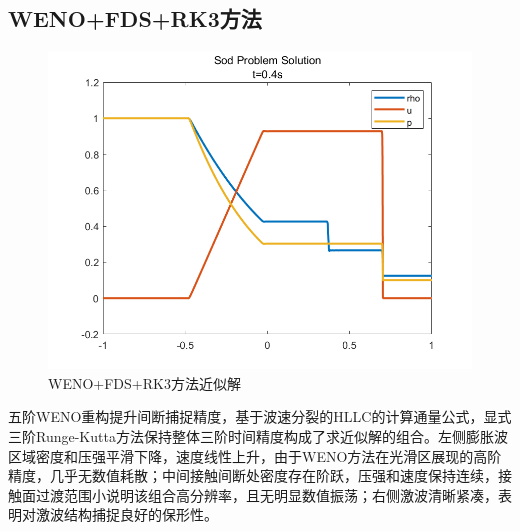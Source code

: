 \documentclass[12pt,a4paper]{article}%
\begin{document}
		\subsection{WENO+FDS+RK3方法}
		\begin{figure}[H]
			\centering
			\begin{minipage}{1\textwidth}
				\centering
				\includegraphics[width=\textwidth]{./fig/app2.png}
				\caption{\fontsize{10pt}{15pt}\selectfont WENO+FDS+RK3方法近似解}
			\end{minipage}
		\end{figure}
		五阶WENO重构提升间断捕捉精度，基于波速分裂的HLLC的计算通量公式，显式三阶Runge-Kutta方法保持整体三阶时间精度构成了求近似解的组合。左侧膨胀波区域密度和压强平滑下降，速度线性上升，由于WENO方法在光滑区展现的高阶精度，几乎无数值耗散；中间接触间断处密度存在阶跃，压强和速度保持连续，接触面过渡范围小说明该组合高分辨率，且无明显数值振荡；右侧激波清晰紧凑，表明对激波结构捕捉良好的保形性。
		
		
\end{document}
